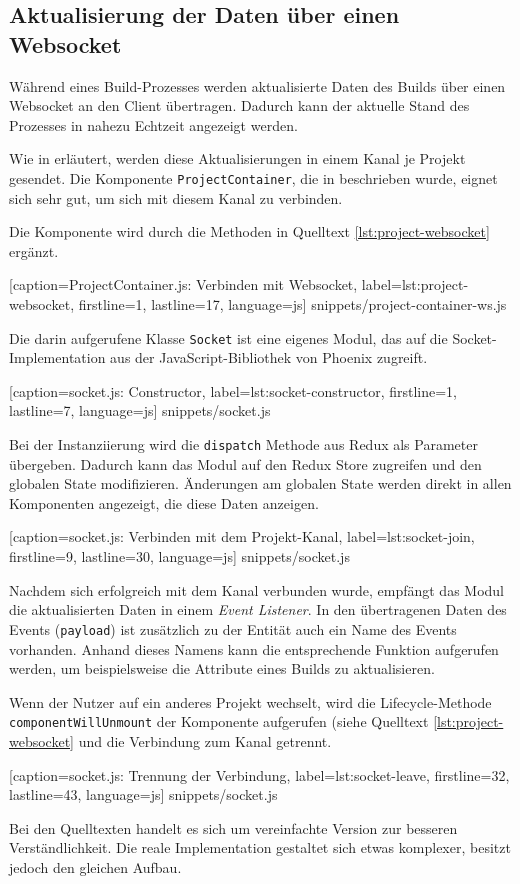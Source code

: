 \subsection{Aktualisierung der Daten über einen Websocket}

Während eines Build-Prozesses werden aktualisierte Daten des Builds über einen Websocket an den Client übertragen. Dadurch kann der aktuelle Stand des Prozesses in nahezu Echtzeit angezeigt werden.

Wie in  erläutert, werden diese Aktualisierungen in einem Kanal je Projekt gesendet. Die Komponente \texttt{Project\-Con\-tain\-er}, die in  beschrieben wurde, eignet sich sehr gut, um sich mit diesem Kanal zu verbinden.

Die Komponente wird durch die Methoden in Quelltext \ref{lst:project-websocket} ergänzt.


  [caption={ProjectContainer.js: Verbinden mit Websocket},
  label={lst:project-websocket},
  firstline=1,
  lastline=17,
  language=js]
  {snippets/project-container-ws.js}

Die darin aufgerufene Klasse \texttt{Socket} ist eine eigenes Modul, das auf die Socket-Implementation aus der JavaScript-Bibliothek von Phoenix zugreift.


  [caption={socket.js: Constructor},
  label={lst:socket-constructor},
  firstline=1,
  lastline=7,
  language=js]
  {snippets/socket.js}

Bei der Instanziierung wird die \texttt{dispatch} Methode aus Redux als Pa\-ra\-me\-ter über\-ge\-ben. Dadurch kann das Modul auf den Redux Store zugreifen und den globalen State modifizieren. Änderungen am globalen State werden direkt in allen Komponenten angezeigt, die diese Daten anzeigen.


  [caption={socket.js: Verbinden mit dem Projekt-Kanal},
  label={lst:socket-join},
  firstline=9,
  lastline=30,
  language=js]
  {snippets/socket.js}

Nachdem sich erfolgreich mit dem Kanal verbunden wurde, empfängt das Modul die aktualisierten Daten in einem \emph{Event Listener}. In den übertragenen Daten des Events (\texttt{payload}) ist zusätzlich zu der Entität auch ein Name des Events vorhanden. Anhand dieses Namens kann die entsprechende Funktion aufgerufen werden, um beispielsweise die Attribute eines Builds zu aktualisieren.

Wenn der Nutzer auf ein anderes Projekt wechselt, wird die Lifecycle-Methode \texttt{componentWillUnmount} der Komponente aufgerufen (siehe Quelltext \ref{lst:project-websocket} und die Verbindung zum Kanal getrennt.


  [caption={socket.js: Trennung der Verbindung},
  label={lst:socket-leave},
  firstline=32,
  lastline=43,
  language=js]
  {snippets/socket.js}

Bei den Quelltexten handelt es sich um vereinfachte Version zur besseren Ver\-ständ\-lich\-keit. Die reale Implementation gestaltet sich etwas komplexer, besitzt jedoch den gleichen Aufbau.
